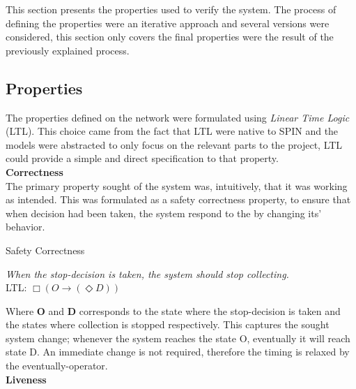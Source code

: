 This section presents the properties used to verify the system. The process of defining the properties were an iterative approach and several versions were considered, this section only covers the final properties were the result of the previously explained process.

\subsection{Properties}

The properties defined on the network were formulated using \textit{Linear Time Logic} (LTL). This choice came from the fact that LTL were native to SPIN and the models were abstracted to only focus on the relevant parts to the project, LTL could provide a simple and direct specification to that property. \\

\textbf{Correctness} \\

The primary property sought of the system was, intuitively, that it was working as intended. This was formulated as a safety correctness property, to ensure that when decision had been taken, the system respond to the by changing its' behavior.


\begin{definition}{}{} 
Safety Correctness

\textit{When the stop-decision is taken, the system should stop collecting.} \\ 

LTL: $\Box (O \rightarrow (\Diamond D)) $ \\
\end{definition}

Where \textbf{O} and \textbf{D} corresponds to the state where the stop-decision is taken and the states where collection is stopped respectively. This captures the sought system change; whenever the system reaches the state O, eventually it will reach state D. An immediate change is not required, therefore the timing is relaxed by the eventually-operator. \\

\textbf{Liveness} \\


